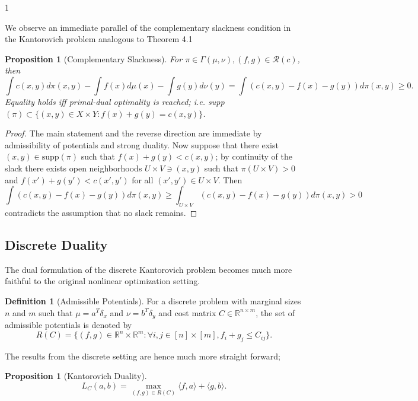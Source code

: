 \documentclass[12pt]{article}
\newtheorem{proposition}[theorem]{Proposition}
\theoremstyle{definition}
\newtheorem{definition}[theorem]{Definition}
\theoremstyle{plain}
\begin{document}
\begin{spacing}{1}
{We observe an immediate parallel of the complementary slackness condition in the Kantorovich problem analogous to Theorem 4.1
\begin{proposition}[Complementary Slackness]
    For $\pi \in \Gamma(\mu, \nu), (f, g) \in \mathcal{R}(c)$, then
    \[
    \displaystyle \int c(x, y) d\pi(x, y) - \int f(x)d\mu(x) - \int g(y)d\nu(y) = \int ( c(x, y) - f(x) - g(y))d\pi(x, y) \geq 0.
    \]
    Equality holds iff primal-dual optimality is reached; i.e. supp$(\pi) \subset \{(x, y) \in X \times Y: f(x) + g(y) = c(x, y)\}$.
\end{proposition}

\begin{proof}
    The main statement and the reverse direction are immediate by admissibility of potentials and strong duality. Now suppose that there exist $(x, y) \in \text{supp}(\pi)$ such that $f(x) + g(y) < c(x, y)$; by continuity of the slack there exists open neighborhoods $U \times V \ni (x, y)$ such that $\pi(U \times V) > 0$ and $f(x') + g(y') < c(x', y')$ for all $(x', y') \in U \times V$. Then
    \[
    \displaystyle \int (c(x, y) - f(x) - g(y))d\pi(x, y) \geq \int_{U \times V} (c(x, y) - f(x) - g(y))d\pi(x, y) > 0
    \]
    contradicts the assumption that no slack remains.
\end{proof}

\subsection{Discrete Duality}
The dual formulation of the discrete Kantorovich problem becomes much more faithful to the original nonlinear optimization setting.

\begin{definition}[Admissible Potentials]
    For a discrete problem with marginal sizes $n$ and $m$ such that $\mu = a^T \delta_x$ and $\nu = b^T \delta_y$ and cost matrix $C \in \mathbb{R}^{n \times m}$, the set of admissible potentials is denoted by
    \[
    R(C) = \{(f, g) \in \mathbb{R}^n \times \mathbb{R}^m: \forall i, j \in [n] \times [m], f_i + g_j \leq C_{ij}\}.
    \]
\end{definition}

The results from the discrete setting are hence much more straight forward;

\begin{proposition}[Kantorovich Duality]
    \[
    L_C(a, b) = \max_{(f, g) \in R(C)} \langle f, a \rangle + \langle g, b \rangle.
    \]
\end{proposition}

}
\end{spacing}
\end{document}

